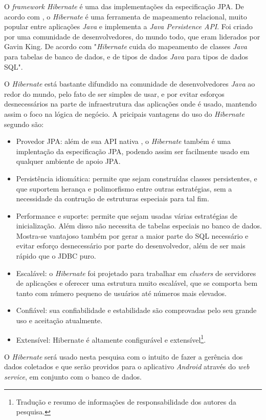 	\par O \textit{framework Hibernate} é uma das implementações da especificação
JPA. De acordo com , o \textit{Hibernate} é
uma ferramenta de mapeamento relacional, muito popular entre aplicações
\textit{Java} e implementa a \textit{Java Persistence API}. Foi criado por uma
comunidade de desenvolvedores, do mundo todo, que eram liderados por Gavin King.
De acordo com  "\textit{Hibernate} cuida do mapeamento
de classes \textit{Java} para tabelas de banco de dados, e de tipos de dados
\textit{Java} para tipos de dados SQL".

	\par O \textit{Hibernate} está bastante difundido na comunidade de
desenvolvedores \textit{Java} ao redor do mundo, pelo fato de ser simples de
usar, e por evitar esforços desnecessários na parte de infraestrutura das
aplicações onde é usado, mantendo assim o foco na lógica de negócio. A pricipais
vantagens do uso do \textit{Hibernate} segundo
 são:

	\begin{itemize}
	  
	  		\item Provedor JPA: além de sua API nativa , o \textit{Hibernate}
	  	também é uma implentação da especificação JPA, podendo assim ser facilmente
	  	usado em qualquer ambiente de apoio JPA.
	  		
	  		\item Persistência idiomática: permite que sejam construídas classes
	  	persistentes, e que suportem herança e polimorfismo
	  	entre outras estratégias, sem a necessidade da contrução de estruturas
	  	especiais para tal fim.
	  	
	  		\item Performance e suporte: permite que sejam usadas várias estratégias
	  	 de inicialização. Além disso não necessita de tabelas especiais no banco de
	  	 dados. Mostra-se vantajoso também por gerar a maior parte do SQL
	  	 necessário e evitar esforço desnecessário por parte do desenvolvedor, além
	  	 de ser mais rápido que o JDBC puro.
	  
	  		\item Escalável: o \textit{Hibernate} foi projetado para trabalhar em
	  	\textit{clusters} de servidores de aplicações e oferecer uma estrutura
	  	muito escalável, que se comporta bem tanto com número pequeno de usuários
	  	até números mais elevados.

			\item Confiável: sua confiabilidade e estabilidade são comprovadas pelo
		seu grande uso e aceitação atualmente.
			
			\item Extensível: Hibernate é altamente configurável e
		extensível\footnote{Tradução e resumo de informações de responsabilidade dos
		autores da pesquisa.}.
	
	\end{itemize}
	
	\par O \textit{Hibernate} será usado nesta pesquisa com o intuito de fazer a
gerência dos dados coletados e que serão providos para o aplicativo
\textit{Android} através do \textit{web service}, em conjunto com o banco de
dados.